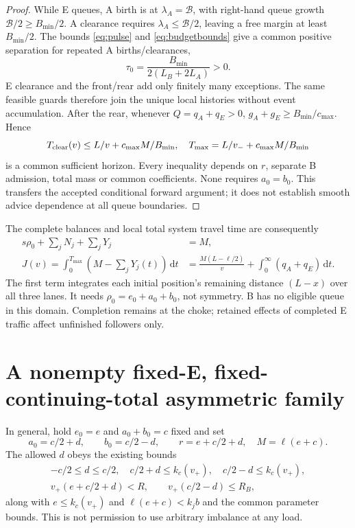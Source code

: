 \documentclass[11pt,a4paper]{article}
\newcommand{\dd}{\,\mathrm d}
\newcommand{\kc}{k_c}
\newcommand{\bud}{\mathcal B}
\begin{document}
\begin{proof}
While E queues, A birth is at $\lambda_A=\bud$, with right-hand queue
growth $\bud/2\geq B_{\min}/2$. A clearance requires
$\lambda_A\leq\bud/2$, leaving a free margin at least $B_{\min}/2$.
The bounds \eqref{eq:pulse} and \eqref{eq:budgetbounds} give a common
positive separation for repeated A births/clearances,
\begin{equation}
 \tau_0=\frac{B_{\min}}{2(L_B+2L_A)}>0.
 \label{eq:separation}
\end{equation}
E clearance and the front/rear add only finitely many exceptions.
The same feasible guards therefore join the unique local histories without
event accumulation. After the rear, whenever $Q=q_A+q_E>0$,
$g_A+g_E\geq B_{\min}/c_{\max}$. Hence
\begin{equation}
 T_{\rm clear}(v)\leq L/v+c_{\max}M/B_{\min},\quad
 T_{\max}=L/v_-+c_{\max}M/B_{\min}
 \label{eq:clearance}
\end{equation}
is a common sufficient horizon. Every inequality depends on $r$, separate
B admission, total mass or common coefficients. None requires $a_0=b_0$.
This transfers the accepted conditional forward argument; it does not
establish smooth advice dependence at all queue boundaries.
\end{proof}

The complete balances and local total system travel time are consequently
\begin{align}
 s\rho_0+\sum_jN_j+\sum_jY_j&=M,\nonumber\\
 J(v)=\int_0^{T_{\max}}\left(M-\sum_jY_j(t)\right)\dd t
 &=\frac{M(L-\ell/2)}v+\int_0^\infty(q_A+q_E)\dd t.
 \label{eq:tst}
\end{align}
The first term integrates each initial position's remaining distance
$(L-x)$ over all three lanes. It needs $\rho_0=e_0+a_0+b_0$, not symmetry.
B has no eligible queue in this domain. Completion remains at the choke;
retained effects of completed E traffic affect unfinished followers only.

\section{A nonempty fixed-E, fixed-continuing-total asymmetric family}
In general, hold $e_0=e$ and $a_0+b_0=c$ fixed and set
\begin{equation}
 a_0=c/2+d,\qquad b_0=c/2-d,\qquad r=e+c/2+d,
 \quad M=\ell(e+c).
 \label{eq:split}
\end{equation}
The allowed $d$ obeys the existing bounds
\begin{equation}
 \begin{gathered}
 -c/2\leq d\leq c/2,\quad
 c/2+d\leq\kc(v_+),\quad c/2-d\leq\kc(v_+),\\
 v_+(e+c/2+d)<R,\qquad v_+(c/2-d)\leq R_B,
 \end{gathered} \label{eq:splitdomain}
\end{equation}
along with $e\leq\kc(v_+)$ and $\ell(e+c)<k_jb$ and the common parameter
bounds. This is not permission to use arbitrary imbalance at any load.
\end{document}
